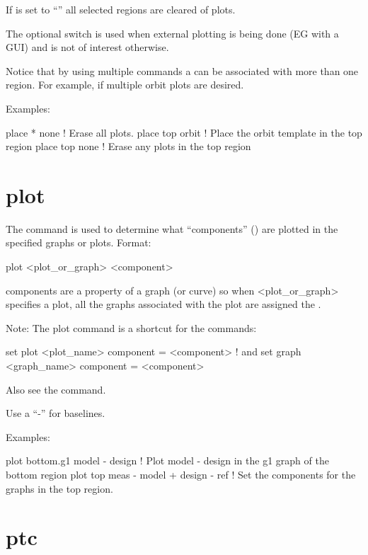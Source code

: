 If  is set to ``'' all selected regions are cleared of plots.

The  optional switch is used when external plotting is being done (EG with a GUI) and
is not of interest otherwise.

Notice that by using multiple  commands a  can be associated with more than
one region. For example, if multiple orbit plots are desired.

Examples:
\begin{example}
  place * none     ! Erase all plots.
  place top orbit  ! Place the orbit template in the top region
  place top none   ! Erase any plots in the top region
\end{example}

\section{plot}
\label{s:plot}

The  command is used to determine what ``components'' () are
plotted in the specified graphs or plots. Format:
\begin{example}
  plot <plot_or_graph> <component>
\end{example}

\vskip 10pt 

components are a property of a graph (or curve) so when <plot_or_graph> specifies a plot, all the
graphs associated with the plot are assigned the .

Note: The plot command is a shortcut for the commands:
\begin{example}
  set plot <plot_name> component = <component>     ! and
  set graph <graph_name> component = <component>
\end{example}
Also see the  command.

Use a ``-'' for baselines. 

Examples:
\begin{example}
  plot bottom.g1 model - design        ! Plot model - design in the g1 graph of the bottom region
  plot top meas - model + design - ref ! Set the components for the graphs in the top region.
\end{example}

\section{ptc}
\label{s:ptc}

